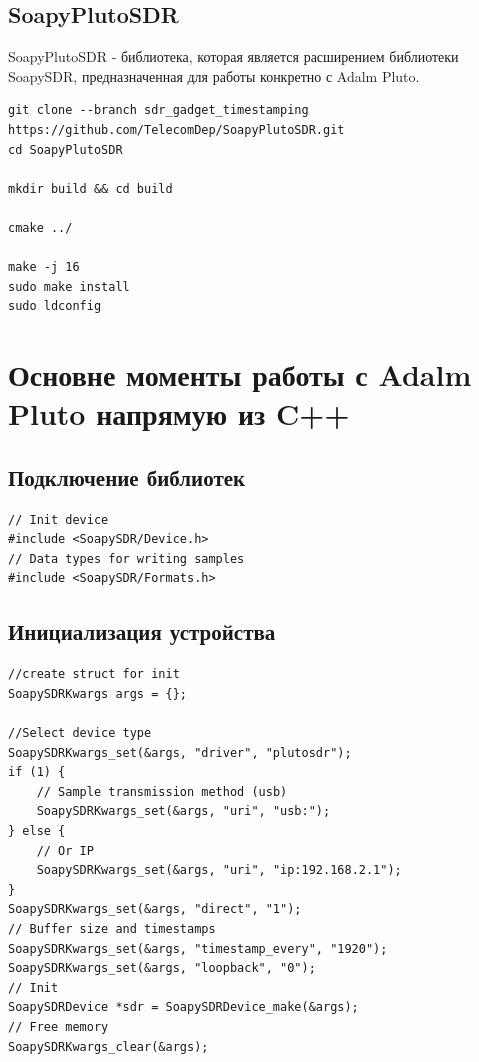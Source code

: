 \subsection{SoapyPlutoSDR}

SoapyPlutoSDR - библиотека, которая является расширением библиотеки SoapySDR, предназначенная для работы конкретно с Adalm Pluto. 

\begin{lstlisting}
git clone --branch sdr_gadget_timestamping https://github.com/TelecomDep/SoapyPlutoSDR.git
cd SoapyPlutoSDR

mkdir build && cd build

cmake ../

make -j 16
sudo make install
sudo ldconfig
\end{lstlisting}

\section{Основне моменты работы с Adalm Pluto напрямую из C++}

\subsection{Подключение библиотек}

\begin{lstlisting}
// Init device
#include <SoapySDR/Device.h>  
// Data types for writing samples 
#include <SoapySDR/Formats.h>  
\end{lstlisting}

\subsection{Инициализация устройства}

\begin{lstlisting}
//create struct for init
SoapySDRKwargs args = {};

//Select device type
SoapySDRKwargs_set(&args, "driver", "plutosdr");       
if (1) {
    // Sample transmission method (usb)
    SoapySDRKwargs_set(&args, "uri", "usb:");           
} else {
    // Or IP
    SoapySDRKwargs_set(&args, "uri", "ip:192.168.2.1"); 
}
SoapySDRKwargs_set(&args, "direct", "1");
// Buffer size and timestamps              
SoapySDRKwargs_set(&args, "timestamp_every", "1920");  
SoapySDRKwargs_set(&args, "loopback", "0");
// Init             
SoapySDRDevice *sdr = SoapySDRDevice_make(&args);    
// Free memory   
SoapySDRKwargs_clear(&args);
\end{lstlisting}

